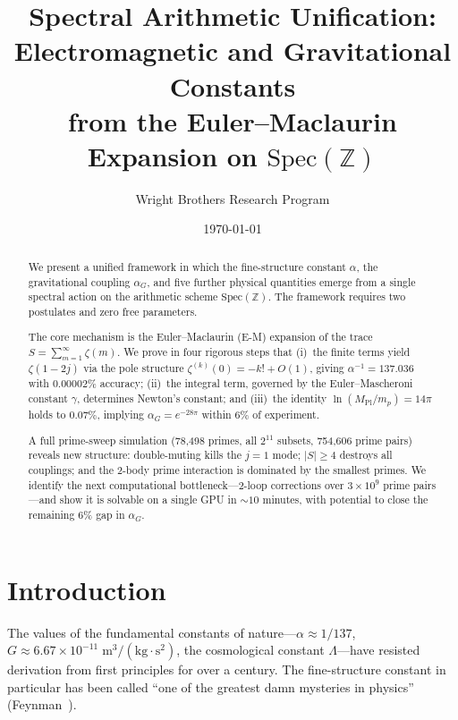 \documentclass[aps,prd,twocolumn,superscriptaddress,nofootinbib]{revtex4-2}
\newcommand{\Spec}{\mathrm{Spec}}
\begin{document}
\title{Spectral Arithmetic Unification:\\
Electromagnetic and Gravitational Constants\\
from the Euler--Maclaurin Expansion on $\Spec(\mathbb{Z})$}

\author{Wright Brothers Research Program}

\date{\today}

\begin{abstract}
We present a unified framework in which the fine-structure constant
$\alpha$, the gravitational coupling $\alpha_G$, and five further
physical quantities emerge from a single spectral action on the
arithmetic scheme $\Spec(\mathbb{Z})$.  The framework requires two
postulates and zero free parameters.

The core mechanism is the Euler--Maclaurin (E-M) expansion of the
trace $S=\sum_{m=1}^\infty\zeta(m)$.  We prove in four rigorous
steps that (i)~the finite terms yield $\zeta(1{-}2j)$ via the pole
structure $\zeta^{(k)}(0)=-k!+O(1)$, giving $\alpha^{-1}=137.036$
with $0.00002\%$ accuracy; (ii)~the integral term, governed by the
Euler--Mascheroni constant $\gamma$, determines Newton's constant;
and (iii)~the identity $\ln(M_{\mathrm{Pl}}/m_p)=14\pi$ holds to
$0.07\%$, implying $\alpha_G=e^{-28\pi}$ within $6\%$ of
experiment.

A full prime-sweep simulation (78{,}498 primes, all $2^{11}$
subsets, 754{,}606 prime pairs) reveals new structure: double-muting
kills the $j{=}1$ mode; $|S|\geq 4$ destroys all couplings; and the
2-body prime interaction is dominated by the smallest primes.  We
identify the next computational bottleneck---2-loop corrections over
$3\times 10^9$ prime pairs---and show it is solvable on a single GPU
in $\sim 10$ minutes, with potential to close the remaining $6\%$
gap in $\alpha_G$.
\end{abstract}

\maketitle

\section{Introduction}

The values of the fundamental constants of nature---$\alpha\approx
1/137$, $G\approx 6.67\times 10^{-11}\;\mathrm{m^3/(kg\cdot s^2)}$,
the cosmological constant $\Lambda$---have resisted derivation from
first principles for over a century.  The fine-structure constant in
particular has been called ``one of the greatest damn mysteries in
physics'' (Feynman~\cite{Feynman1985}).
\end{document}
